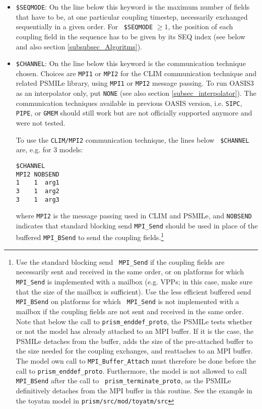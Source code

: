 \begin{itemize}

\item {\tt \$SEQMODE}: On the line below this keyword is the maximum number of fields that
  have to be, at one particular coupling timestep,
  necessarily exchanged sequentially in a given order.  For {\tt
  \$SEQMODE} $\ge 1$, the position of each coupling field in the sequence has to be
  given by its SEQ index (see below and also section
  \ref{subsubsec_Algoritms}).

\item {\tt \$CHANNEL}: On the line below this keyword is the
communication technique chosen. Choices are {\tt MPI1} or {\tt MPI2}
for the CLIM communication technique and related PSMILe library, using
{\tt MPI1} or {\tt MPI2} message passing.  To run OASIS3 as an
interpolator only, put {\tt NONE} (see also section
\ref{subsec_interpolator}). 
The communication techniques available in previous OASIS version, i.e.
{\tt SIPC}, {\tt PIPE}, or {\tt GMEM} should still work but are not
officially supported anymore and were not tested.

To use the {\tt CLIM/MPI2} communication technique, the lines below {\tt
  \$CHANNEL} are, e.g. for 3 models:
\begin{verbatim} 
$CHANNEL 
MPI2 NOBSEND
1    1  arg1 
3    1  arg2
3    1  arg3 
\end{verbatim}
where {\tt MPI2} is the message passing used in CLIM and PSMILe, and
{\tt NOBSEND} indicates that standard blocking send {\tt MPI\_Send}
should be used in place of the buffered {\tt MPI\_BSend} to send the
coupling fields.\footnote{Use the standard blocking send {\tt
MPI\_Send} if the coupling fields are necessarily sent and received in
the same order, or on platforms for which {\tt MPI\_Send} is
implemented with a mailbox (e.g. VPPs; in this case, make sure
that the size of the mailbox is sufficient). Use the less efficient
buffered send {\tt MPI\_BSend} on platforms for which {\tt
MPI\_Send} is not implemented with a mailbox if the
coupling fields are not sent and received in the same order.
Note that below the call to {\tt prism\_enddef\_proto}, the PSMILe
tests whether or not the model has already attached to an MPI
buffer. If it is the case, the PSMILe detaches from the buffer, adds
the size of the pre-attached buffer to the size needed for the
coupling exchanges, and reattaches to an MPI buffer. The model own
call to {\tt MPI\_Buffer\_Attach} must therefore be done before the
call to {\tt prism\_enddef\_proto}. Furthermore, the model is not
allowed to call {\tt MPI\_BSend} after the call to {\tt
prism\_terminate\_proto}, as the PSMILe definitively detaches from the
MPI buffer in this routine. See the example in the toyatm model in
{\tt prism/src/mod/toyatm/src} }


\end{itemize}
